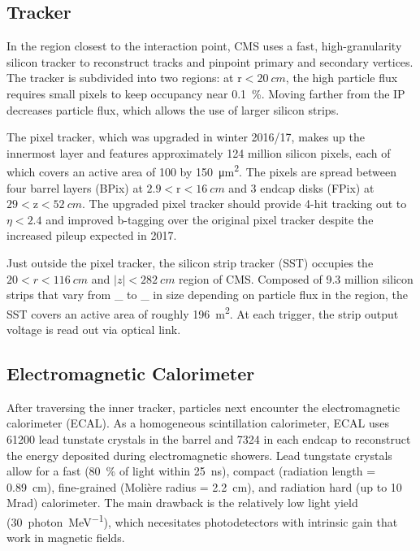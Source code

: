 \documentclass[12pt]{article}
\begin{document}
\subsection{Tracker}
    In the region closest to the interaction point, CMS uses a fast, high-granularity silicon tracker to reconstruct tracks and pinpoint primary and secondary vertices. The tracker is subdivided into two regions: at $\mathrm{r}<\SI{20}{cm}$, the high particle flux  requires small pixels to keep occupancy near \SI{0.1}{\percent}. Moving farther from the IP decreases particle flux, which allows the use of larger silicon strips.

    The pixel tracker, which was upgraded in winter 2016/17, makes up the innermost layer and features approximately \num{124} million silicon pixels, each of which covers an active area of \num{100} by \SI{150}{\micro\meter^2}. The pixels are spread between four barrel layers (BPix) at $\num{2.9}<\mathrm{r}<\SI{16}{cm}$ and 3 endcap disks (FPix) at $\num{29} < \mathrm{z} < \SI{52}{cm}$. The upgraded pixel tracker should provide 4-hit tracking out to $\eta < \num{2.4}$ and improved b-tagging over the original pixel tracker despite the increased pileup expected in 2017.
    
    Just outside the pixel tracker, the silicon strip tracker (SST) occupies the $\num{20} < r < \SI{116}{cm}$ and $\lvert z \rvert < \SI{282}{cm}$ region of CMS. Composed of \num{9.3} million silicon strips that vary from \_ to \_ in size  depending on particle flux in the region, the SST covers an active area of roughly \SI{196}{m^2}. At each trigger, the strip output voltage is read out via optical link.

\subsection{Electromagnetic Calorimeter}
    After traversing the inner tracker, particles next encounter the electromagnetic calorimeter (ECAL). As a homogeneous scintillation calorimeter, ECAL uses \num{61200} lead tunstate crystals in the barrel and \num{7324} in each endcap to reconstruct the energy deposited during electromagnetic showers. Lead tungstate crystals allow for a fast (\SI{80}{\percent} of light within \SI{25}{ns}), compact (radiation length = \SI{0.89}{cm}), fine-grained (Moli\`ere radius = \SI{2.2}{cm}), and radiation hard (up to 10 Mrad) calorimeter. The main drawback is the relatively low light yield (\SI{30}{photon\per\mega\electronvolt}), which necesitates photodetectors with intrinsic gain that work in magnetic fields.
\end{document}
